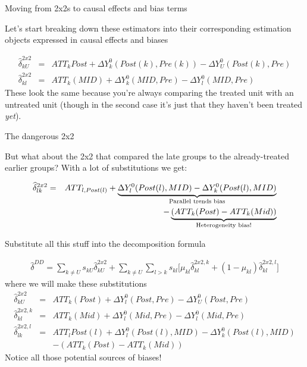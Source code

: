 \documentclass{beamer}
\begin{document}
\begin{frame}{Moving from 2x2s to causal effects and bias terms}

Let's start breaking down these estimators into their corresponding estimation objects expressed in causal effects and biases


\begin{eqnarray*}
\widehat{\delta}^{2x2}_{kU} &=& ATT_k{Post} + \Delta Y^0_k(Post(k),Pre(k)) - \Delta Y^0_U(Post(k),Pre) \\
\widehat{\delta}^{2x2}_{kl} &=& ATT_k(MID) + \Delta Y^0_k(MID,Pre) - \Delta Y^0_l(MID, Pre)
\end{eqnarray*}These look the same because you're always comparing the treated unit with an untreated unit (though in the second case it's just that they haven't been treated \emph{yet}). 

\end{frame}

\begin{frame}{The dangerous 2x2}

But what about the 2x2 that compared the late groups to the already-treated earlier groups? With a lot of substitutions we get:

\begin{eqnarray*}
\widehat{\delta}^{2x2}_{lk} &=& ATT_{l,Post(l)} + \underbrace{\Delta Y^0_l(Post(l),MID) - \Delta Y^0_k ( Post(l), MID)}_{\mathclap{\text{Parallel trends bias}}} \\
&& - \underbrace{(ATT_k(Post) - ATT_k(Mid))}_{\mathclap{\text{Heterogeneity bias!}}}
\end{eqnarray*}


\end{frame}

\begin{frame}{Substitute all this stuff into the decomposition formula}

\begin{eqnarray*}	
\widehat{\delta}^{DD} = \sum_{k \neq U} s_{kU}\widehat{\delta}_{kU}^{2x2} + \sum_{k \neq U} \sum_{l>k} s_{kl}  \bigg [ \mu_{kl}\widehat{\delta}_{kl}^{2x2,k} + (1-\mu_{kl}) \widehat{\delta}_{kl}^{2x2,l} \bigg]
\end{eqnarray*}where we will make these substitutions\begin{eqnarray*}
\widehat{\delta}_{kU}^{2x2} &=& ATT_k(Post) + \Delta Y_l^0(Post,Pre) - \Delta Y_U^0(Post, Pre) \\
\widehat{\delta}_{kl}^{2x2,k} &=& ATT_k(Mid) + \Delta Y_l^0(Mid,Pre) - \Delta Y_l^0(Mid, Pre) \\
\widehat{\delta}^{2x2,l}_{lk} &=& ATT_{l}Post(l) + \Delta Y^0_l(Post(l),MID) - \Delta Y^0_k ( Post(l), MID) \\
&&- (ATT_k(Post) - ATT_k(Mid))
\end{eqnarray*}Notice all those potential sources of biases! 

\end{frame}
\end{document}
